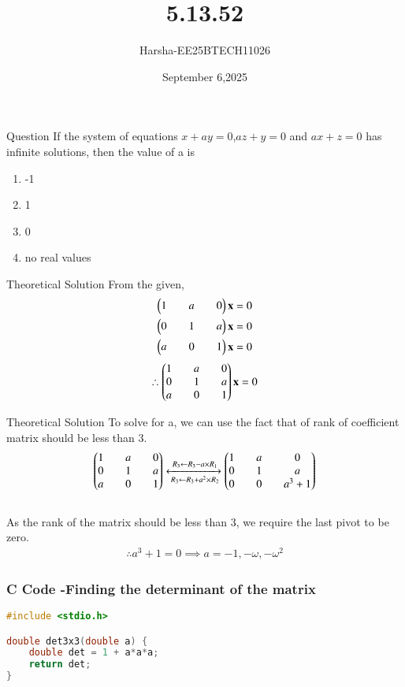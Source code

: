 \documentclass{beamer}
\title %
{5.13.52}
\date{September 6,2025}
\author %
{Harsha-EE25BTECH11026}
\begin{document}
\frame{\titlepage}


\begin{frame}{Question}
If the system of equations $x + ay = 0$,$az + y = 0$ and $ax + z = 0$ has infinite solutions, then the value of a is
\begin{enumerate}
    \item -1
    \item 1
    \item 0
    \item no real values
\end{enumerate}
\end{frame}

\begin{frame}{Theoretical Solution}
From the given,
\begin{align}
    \begin{pmatrix}1&&a&&0\end{pmatrix}\mathbf{x}=0\\
    \begin{pmatrix}0&&1&&a\end{pmatrix}\mathbf{x}=0\\
    \begin{pmatrix}a&&0&&1\end{pmatrix}\mathbf{x}=0
\end{align}
\begin{align}
    \therefore \begin{pmatrix}1&&a&&0\\0&&1&&a\\a&&0&&1\end{pmatrix}\mathbf{x}=0
\end{align}
\end{frame}

\begin{frame}{Theoretical Solution}
To solve for a, we can use the fact that of rank of coefficient matrix should be less than 3.
\begin{align}
    \begin{pmatrix}1&&a&&0\\0&&1&&a\\a&&0&&1\end{pmatrix}
    \xleftrightarrow[\,R_3 \gets R_3+ a^2 \times R_2]{\, R_3 \gets R_3- a \times R_1}
    \begin{pmatrix}1&&a&&0\\0&&1&&a\\0&&0&&a^3+1\end{pmatrix}
\end{align}
\\
As the rank of the matrix should be less than 3, we require the last pivot to be zero.
\begin{align}
    \therefore a^3+1=0 \implies a=-1,-\omega,-\omega^2
\end{align}
\end{frame}

\begin{frame}[fragile]
    \frametitle{C Code -Finding the determinant of the matrix}

    \begin{lstlisting}[language=C]
#include <stdio.h>

double det3x3(double a) {
    double det = 1 + a*a*a;
    return det;
}
    \end{lstlisting}
\end{frame}
\end{document}
